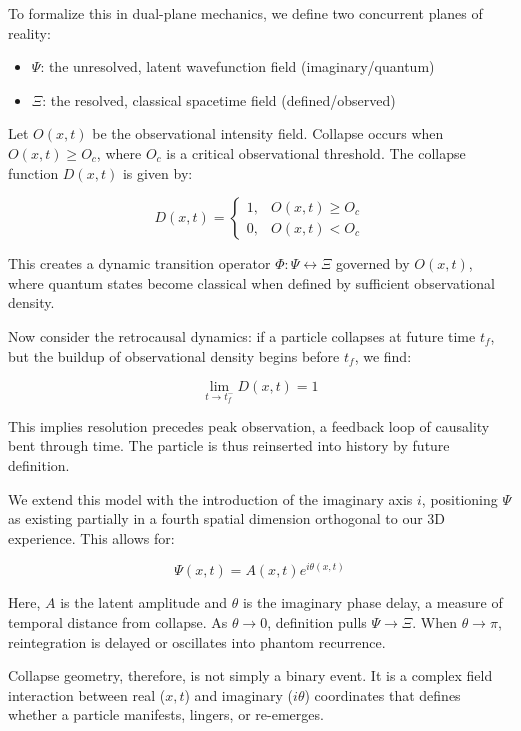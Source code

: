 To formalize this in dual-plane mechanics, we define two concurrent planes of reality:

\begin{itemize}
    \item \( \Psi \): the unresolved, latent wavefunction field (imaginary/quantum)
    \item \( \Xi \): the resolved, classical spacetime field (defined/observed)
\end{itemize}

Let \( O(x,t) \) be the observational intensity field. Collapse occurs when \( O(x,t) \geq O_c \), where \( O_c \) is a critical observational threshold. The collapse function \( D(x,t) \) is given by:

\[
D(x,t) = \begin{cases} 
1, & O(x,t) \geq O_c \\
0, & O(x,t) < O_c
\end{cases}
\]

This creates a dynamic transition operator \( \Phi: \Psi \leftrightarrow \Xi \) governed by \( O(x,t) \), where quantum states become classical when defined by sufficient observational density.

Now consider the retrocausal dynamics: if a particle collapses at future time \( t_f \), but the buildup of observational density begins before \( t_f \), we find:

\[
\lim_{t \to t_f^-} D(x,t) = 1
\]

This implies resolution precedes peak observation, a feedback loop of causality bent through time. The particle is thus reinserted into history by future definition.

We extend this model with the introduction of the imaginary axis \( i \), positioning \( \Psi \) as existing partially in a fourth spatial dimension orthogonal to our 3D experience. This allows for:

\[
\Psi(x, t) = A(x, t) e^{i \theta(x,t)}
\]

Here, \( A \) is the latent amplitude and \( \theta \) is the imaginary phase delay, a measure of temporal distance from collapse. As \( \theta \to 0 \), definition pulls \( \Psi \to \Xi \). When \( \theta \to \pi \), reintegration is delayed or oscillates into phantom recurrence.

Collapse geometry, therefore, is not simply a binary event. It is a complex field interaction between real (\( x, t \)) and imaginary (\( i\theta \)) coordinates that defines whether a particle manifests, lingers, or re-emerges.

